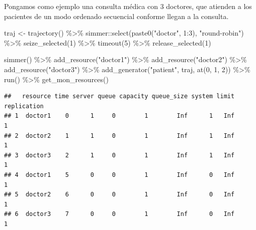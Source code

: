 \documentclass[
]{book}
\newenvironment{Shaded}{\begin{snugshade}}{\end{snugshade}}
\newcommand{\DecValTok}[1]{\textcolor[rgb]{0.00,0.00,0.81}{#1}}
\newcommand{\FunctionTok}[1]{\textcolor[rgb]{0.00,0.00,0.00}{#1}}
\newcommand{\NormalTok}[1]{#1}
\newcommand{\OtherTok}[1]{\textcolor[rgb]{0.56,0.35,0.01}{#1}}
\newcommand{\SpecialCharTok}[1]{\textcolor[rgb]{0.00,0.00,0.00}{#1}}
\newcommand{\StringTok}[1]{\textcolor[rgb]{0.31,0.60,0.02}{#1}}
\theoremstyle{definition}
\theoremstyle{definition}
\theoremstyle{definition}
\theoremstyle{definition}
\theoremstyle{remark}
\begin{document}
Pongamos como ejemplo una consulta médica con 3 doctores, que atienden a los pacientes de un modo ordenado secuencial conforme llegan a la consulta.

\begin{Shaded}
\begin{Highlighting}[]
\NormalTok{traj }\OtherTok{\textless{}{-}} \FunctionTok{trajectory}\NormalTok{() }\SpecialCharTok{\%\textgreater{}\%}
\NormalTok{  simmer}\SpecialCharTok{::}\FunctionTok{select}\NormalTok{(}\FunctionTok{paste0}\NormalTok{(}\StringTok{"doctor"}\NormalTok{, }\DecValTok{1}\SpecialCharTok{:}\DecValTok{3}\NormalTok{), }\StringTok{"round{-}robin"}\NormalTok{) }\SpecialCharTok{\%\textgreater{}\%}
  \FunctionTok{seize\_selected}\NormalTok{(}\DecValTok{1}\NormalTok{) }\SpecialCharTok{\%\textgreater{}\%}
  \FunctionTok{timeout}\NormalTok{(}\DecValTok{5}\NormalTok{) }\SpecialCharTok{\%\textgreater{}\%}
  \FunctionTok{release\_selected}\NormalTok{(}\DecValTok{1}\NormalTok{)}

\FunctionTok{simmer}\NormalTok{() }\SpecialCharTok{\%\textgreater{}\%}
  \FunctionTok{add\_resource}\NormalTok{(}\StringTok{"doctor1"}\NormalTok{) }\SpecialCharTok{\%\textgreater{}\%}
  \FunctionTok{add\_resource}\NormalTok{(}\StringTok{"doctor2"}\NormalTok{) }\SpecialCharTok{\%\textgreater{}\%}
  \FunctionTok{add\_resource}\NormalTok{(}\StringTok{"doctor3"}\NormalTok{) }\SpecialCharTok{\%\textgreater{}\%}
  \FunctionTok{add\_generator}\NormalTok{(}\StringTok{"patient"}\NormalTok{, traj, }\FunctionTok{at}\NormalTok{(}\DecValTok{0}\NormalTok{, }\DecValTok{1}\NormalTok{, }\DecValTok{2}\NormalTok{)) }\SpecialCharTok{\%\textgreater{}\%}
  \FunctionTok{run}\NormalTok{() }\SpecialCharTok{\%\textgreater{}\%}
  \FunctionTok{get\_mon\_resources}\NormalTok{()}
\end{Highlighting}
\end{Shaded}

\begin{verbatim}
##   resource time server queue capacity queue_size system limit replication
## 1  doctor1    0      1     0        1        Inf      1   Inf           1
## 2  doctor2    1      1     0        1        Inf      1   Inf           1
## 3  doctor3    2      1     0        1        Inf      1   Inf           1
## 4  doctor1    5      0     0        1        Inf      0   Inf           1
## 5  doctor2    6      0     0        1        Inf      0   Inf           1
## 6  doctor3    7      0     0        1        Inf      0   Inf           1
\end{verbatim}
\end{document}
